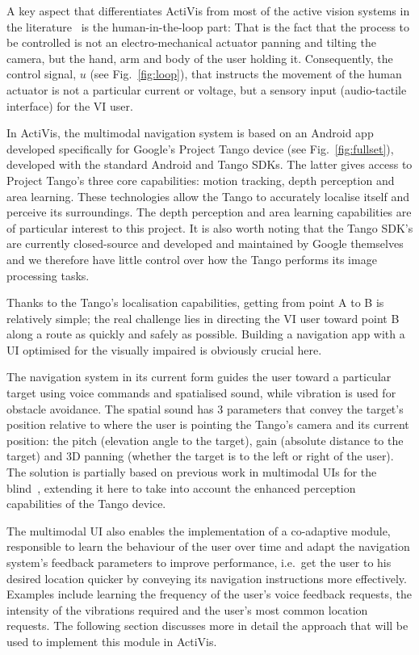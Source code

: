 \documentclass[format=sigconf, review=true, screen=true, anonymous=true]{acmart}
\begin{document}
A key aspect that differentiates ActiVis from most of the active vision systems in the literature~\cite{Rivlin2000} is the human-in-the-loop part: That is the fact that the process to be controlled is not an electro-mechanical actuator panning and tilting the camera, but the hand, arm and body of the user holding it. Consequently, the control signal, $u$ (see Fig.~\ref{fig:loop}), that instructs the movement of the human actuator is not a particular current or voltage, but a sensory input (audio-tactile interface) for the VI user. 

In ActiVis, the multimodal navigation system is based on an Android app developed specifically for Google's Project Tango device (see Fig.~\ref{fig:fullset}), developed with the standard Android and Tango SDKs. The latter gives access to Project Tango's three core capabilities: motion tracking, depth perception and area learning. These technologies allow the Tango to accurately localise itself and perceive its surroundings. The depth perception and area learning capabilities are of particular interest to this project. It is also worth noting that the Tango SDK's are currently closed-source and developed and maintained by Google themselves and we therefore have little control over how the Tango performs its image processing tasks. 

Thanks to the Tango's localisation capabilities, getting from point A to B is relatively simple; the real challenge lies in directing the VI user toward point B along a route as quickly and safely as possible. Building a navigation app with a UI optimised for the visually impaired is obviously crucial here. 

The navigation system in its current form guides the user toward a particular target using voice commands and spatialised sound, while vibration is used for obstacle avoidance. The spatial sound has 3 parameters that convey the target's position relative to where the user is pointing the Tango's camera and its current position: the pitch (elevation angle to the target), gain (absolute distance to the target) and 3D panning (whether the target is to the left or right of the user). The solution is partially based on previous work in multimodal UIs for the blind~\cite{bellotto2013}, extending it here to take into account the enhanced perception capabilities of the Tango device.

The multimodal UI also enables the implementation of a co-adaptive module, responsible to learn the behaviour of the user over time and adapt the navigation system's feedback parameters to improve performance, i.e.\ get the user to his desired location quicker by conveying its navigation instructions more effectively. Examples include learning the frequency of the user's voice feedback requests, the intensity of the vibrations required and the user's most common location requests. The following section discusses more in detail the approach that will be used to implement this module in ActiVis.
\end{document}
